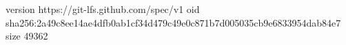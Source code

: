 version https://git-lfs.github.com/spec/v1
oid sha256:2a49c8ee14ae4dfb0ab1cf34d479c49e0c871b7d005035cb9e6833954dab84e7
size 49362
